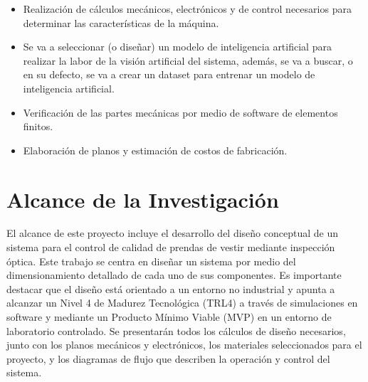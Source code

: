 \begin{itemize}
	\setlength\itemsep{-0.5em}
	\item Realización de cálculos mecánicos, electrónicos y de control necesarios para determinar las características de la máquina.
	\item Se va a seleccionar (o diseñar) un modelo de inteligencia artificial para realizar la labor de la visión artificial del sistema, además, se va a buscar, o en su defecto, se va a crear un dataset para entrenar un modelo de inteligencia artificial.
	\item Verificación de las partes mecánicas por medio de software de elementos finitos.
	\item Elaboración de planos y estimación de costos de fabricación.
\end{itemize}

\section{Alcance de la Investigación}

El alcance de este proyecto incluye el desarrollo del diseño conceptual de un sistema para el control de calidad de prendas de vestir mediante inspección óptica. Este trabajo se centra en diseñar un sistema por medio del dimensionamiento detallado de cada uno de sus componentes. Es importante destacar que el diseño está orientado a un entorno no industrial y apunta a alcanzar un Nivel 4 de Madurez Tecnológica (TRL4) a través de simulaciones en software y mediante un Producto Mínimo Viable (MVP) en un entorno de laboratorio controlado. Se presentarán todos los cálculos de diseño necesarios, junto con los planos mecánicos y electrónicos, los materiales seleccionados para el proyecto, y los diagramas de flujo que describen la operación y control del sistema.